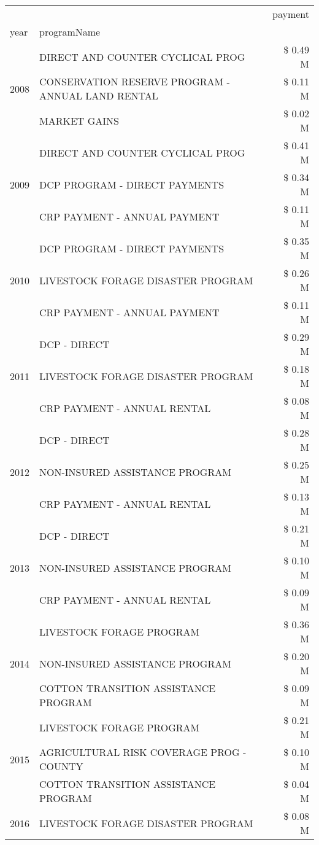 \begin{tabular}{llr}
\toprule
 &  & payment \\
year & programName &  \\
\midrule
\multirow[t]{3}{*}{2008} & DIRECT AND COUNTER CYCLICAL PROG & \$ 0.49 M \\
 & CONSERVATION RESERVE PROGRAM - ANNUAL LAND RENTAL & \$ 0.11 M \\
 & MARKET GAINS & \$ 0.02 M \\
\cline{1-3}
\multirow[t]{3}{*}{2009} & DIRECT AND COUNTER CYCLICAL PROG & \$ 0.41 M \\
 & DCP PROGRAM - DIRECT PAYMENTS & \$ 0.34 M \\
 & CRP PAYMENT - ANNUAL PAYMENT & \$ 0.11 M \\
\cline{1-3}
\multirow[t]{3}{*}{2010} & DCP PROGRAM - DIRECT PAYMENTS & \$ 0.35 M \\
 & LIVESTOCK FORAGE DISASTER  PROGRAM & \$ 0.26 M \\
 & CRP PAYMENT - ANNUAL PAYMENT & \$ 0.11 M \\
\cline{1-3}
\multirow[t]{3}{*}{2011} & DCP - DIRECT & \$ 0.29 M \\
 & LIVESTOCK FORAGE DISASTER PROGRAM & \$ 0.18 M \\
 & CRP PAYMENT - ANNUAL RENTAL & \$ 0.08 M \\
\cline{1-3}
\multirow[t]{3}{*}{2012} & DCP - DIRECT & \$ 0.28 M \\
 & NON-INSURED ASSISTANCE PROGRAM & \$ 0.25 M \\
 & CRP PAYMENT - ANNUAL RENTAL & \$ 0.13 M \\
\cline{1-3}
\multirow[t]{3}{*}{2013} & DCP - DIRECT & \$ 0.21 M \\
 & NON-INSURED ASSISTANCE PROGRAM & \$ 0.10 M \\
 & CRP PAYMENT - ANNUAL RENTAL & \$ 0.09 M \\
\cline{1-3}
\multirow[t]{3}{*}{2014} & LIVESTOCK FORAGE PROGRAM & \$ 0.36 M \\
 & NON-INSURED ASSISTANCE PROGRAM & \$ 0.20 M \\
 & COTTON TRANSITION ASSISTANCE PROGRAM & \$ 0.09 M \\
\cline{1-3}
\multirow[t]{3}{*}{2015} & LIVESTOCK FORAGE PROGRAM & \$ 0.21 M \\
 & AGRICULTURAL RISK COVERAGE PROG - COUNTY & \$ 0.10 M \\
 & COTTON TRANSITION ASSISTANCE PROGRAM & \$ 0.04 M \\
\cline{1-3}
\multirow[t]{3}{*}{2016} & LIVESTOCK FORAGE DISASTER PROGRAM & \$ 0.08 M \\

\end{tabular}
